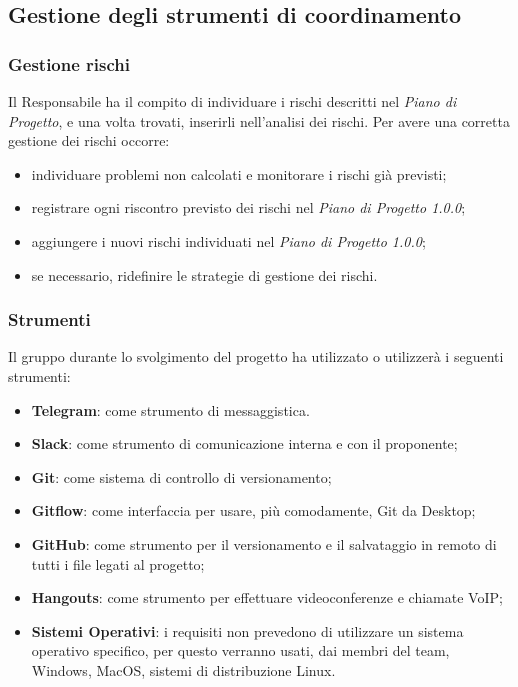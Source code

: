    	\subsection{Gestione degli strumenti di coordinamento}
  
   		\subsubsection{Gestione rischi}
   		Il Responsabile ha il compito di individuare i rischi descritti nel \textit{Piano di Progetto\docs}, e una volta trovati, inserirli nell'analisi dei rischi. Per avere una corretta gestione dei rischi occorre:
   		\begin{itemize}
   			\item individuare problemi non calcolati e monitorare i rischi già previsti;
   			\item registrare ogni riscontro previsto dei rischi nel \textit{Piano di Progetto 1.0.0\docs};
   			\item aggiungere i nuovi rischi individuati nel \textit{Piano di Progetto 1.0.0\docs};
   			\item se necessario, ridefinire le strategie di gestione dei rischi.
   		\end{itemize}  			
   			
   		\subsubsection{Strumenti}
   			Il gruppo durante lo svolgimento del progetto ha utilizzato o utilizzerà i seguenti strumenti:
   			\begin{itemize}
   				\item \textbf{Telegram}: come strumento di messaggistica.
   				\item \textbf{Slack}: come strumento di comunicazione interna e con il proponente;
   				\item \textbf{Git}: come sistema di controllo di versionamento;
   				\item \textbf{Gitflow}: come interfaccia per usare, più comodamente, Git da Desktop;
   				\item \textbf{GitHub}: come strumento per il versionamento e il salvataggio in remoto di tutti i file legati al progetto;
   				\item \textbf{Hangouts}: come strumento per effettuare videoconferenze e chiamate VoIP;
   				\item \textbf{Sistemi Operativi}: i requisiti non prevedono di utilizzare un sistema operativo specifico, per questo verranno usati, dai membri del team, Windows, MacOS, sistemi di distribuzione Linux.
   			\end{itemize}
